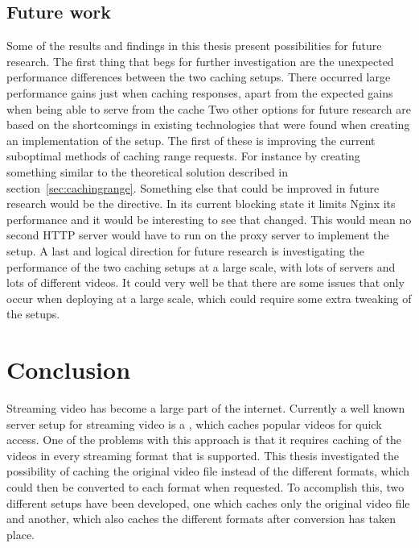 \documentclass[twoside,openright]{uva-bachelor-thesis}
\begin{document}
\section{Future work}
Some of the results and findings in this thesis present possibilities for future
research. The first thing that begs for further investigation are the unexpected
performance differences between the two caching \lt setups. There occurred large
performance gains just when caching responses, apart from the expected gains
when being able to serve from the cache
Two other options for future research are based on the
shortcomings in existing technologies that were found when creating an
implementation of the \lt setup. The first of these is improving the current
suboptimal methods of caching range requests. For instance by creating something
similar to the theoretical solution described in section~\ref{sec:cachingrange}.
Something else that could be improved in future research would be the \ipplong
directive. In its current blocking state it limits Nginx its performance and it
would be interesting to see that changed. This would mean no second HTTP server
would have to run on the proxy server to implement the \lt setup. A last and
logical direction for future research is investigating the performance of the
two caching \lt setups at a large scale, with lots of servers and lots of
different videos. It could very well be that there are some issues that only
occur when deploying at a large scale, which could require some extra tweaking
of the setups.





\chapter{Conclusion}
Streaming video has become a large part of the internet. Currently a well known
server setup for streaming video is a \cdnfull, which caches popular videos
for quick access. One of the problems with this approach is that it requires
caching of the videos in every streaming format that is supported. This thesis
investigated the possibility of caching the original video file instead of the
different formats, which could then be converted to each format when requested.
To accomplish this, two different setups have been developed, one which caches
only the original video file and another, which also caches the different formats
after conversion has taken place.
\end{document}
